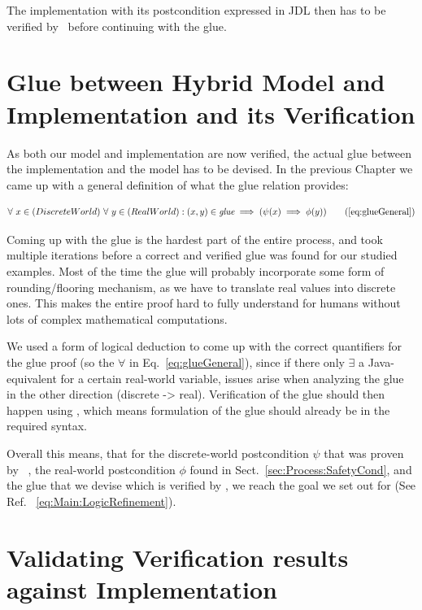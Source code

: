 The implementation with its postcondition expressed in JDL then has to be verified by \key~before continuing with the glue. 

\section{Glue between Hybrid Model and Implementation and its Verification}
\label{sec:Process:Glue}

As both our model and implementation are now verified, the actual glue between the implementation and the model has to be devised. In the previous Chapter we came up with a general definition of what the glue relation provides:

\begin{equation}
	\centering
	\begin{split}
		\forall~x \in (Discrete World)~\forall~y \in (Real World):(x,y) \in \textit{glue} \implies (\psi(x) \implies \phi(y))
	\end{split}
	\tag{\ref{eq:glueGeneral}}
\end{equation}

Coming up with the glue is the hardest part of the entire process, and took multiple iterations before a correct and verified glue was found for our studied examples. Most of the time the glue will probably incorporate some form of rounding/flooring mechanism, as we have to translate real values into discrete ones. This makes the entire proof hard to fully understand for humans without lots of complex mathematical computations.

We used a form of logical deduction to come up with the correct quantifiers for the glue proof (so the \(\forall\) in Eq.~\ref{eq:glueGeneral}), since if there only \(\exists\) a Java-equivalent for a certain real-world variable, issues arise when analyzing the glue in the other direction (discrete -> real). Verification of the glue should then happen using \keym, which means formulation of the glue should already be in the required syntax.

Overall this means, that for the discrete-world postcondition \(\psi\) that was proven by \key~, the real-world postcondition \(\phi\) found in Sect.~\ref{sec:Process:SafetyCond}, and the glue that we devise which is verified by \keym, we reach the goal we set out for (See Ref. ~\ref{eq:Main:LogicRefinement}).

\section{Validating Verification results against Implementation}
\label{sec:Process:Eval}

